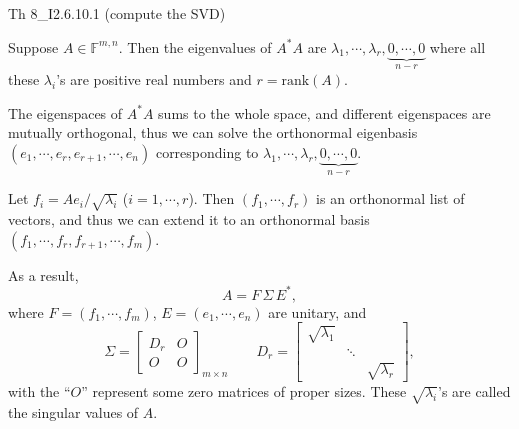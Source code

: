 \documentclass{article}
\begin{document}
\begin{Th}{Th 8\_I2.6.10.1 (compute the SVD)}
    \begin{compactenum}
        \item Suppose $A\in\mathbb{F}^{m,n}$. Then the eigenvalues of $A^\ast A$ are $\lambda_1,\cdots,\lambda_r,\underbrace{0,\cdots,0}_{n-r}$ where all these $\lambda_i$'s are positive real numbers and $r = \text{rank}(A)$. 
        \item The eigenspaces of $A^\ast A$ sums to the whole space, and different eigenspaces are mutually orthogonal, thus we can solve the orthonormal eigenbasis $(e_1,\cdots,e_r,e_{r+1},\cdots,e_n)$ corresponding to $\lambda_1,\cdots,\lambda_r,\underbrace{0,\cdots,0}_{n-r}$.
        \item Let $f_i = Ae_i/\sqrt{\lambda_i}$ ($i=1,\cdots,r$). Then $(f_1,\cdots,f_r)$ is an orthonormal list of vectors, and thus we can extend it to an orthonormal basis $(f_1, \cdots, f_r, f_{r+1}, \cdots, f_m)$.
        \item As a result,
        $$ A = F\,\Sigma\, E^\ast, $$
        where $F = (f_1,\cdots,f_m)$, $E = (e_1,\cdots, e_n)$ are unitary, and
        $$ \Sigma = \begin{bmatrix}
            D_r & O \\
            O & O
        \end{bmatrix}_{m\times n}\qquad D_r = \begin{bmatrix}
            \sqrt{\lambda_1} & & \\
            & \ddots & \\
            & & \sqrt{\lambda_r}
        \end{bmatrix}, $$
        with the ``$O$'' represent some zero matrices of proper sizes. \textcolor{Df}{These $\sqrt{\lambda_i}$'s are called the singular values of $A$.}
    \end{compactenum}
\end{Th}
\end{document}
